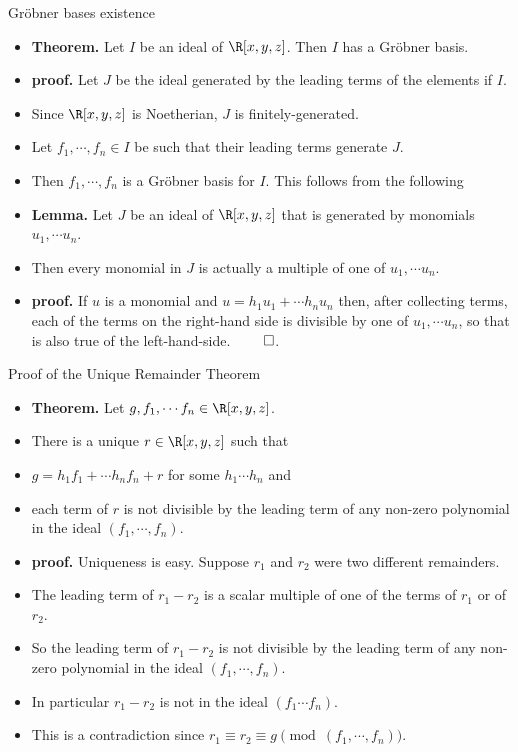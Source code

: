 \documentclass{beamer}
\begin{document}
\begin{frame}{Gr\"{o}bner bases existence}

\begin{itemize}
  \item \textbf{Theorem.} Let $I$ be an ideal of $\R[x,y,z]$. Then $I$ has a Gr\"{o}bner basis.
  \item \textbf{proof.} Let $J$ be the ideal generated by the leading terms of the elements if $I$.
  \item Since $\R[x,y,z]$ is Noetherian, $J$ is finitely-generated.
  \item Let $f_1,\cdots,f_n\in I$ be such that their leading terms generate $J$.
  \item Then $f_1,\cdots, f_n$ is a Gr\"{o}bner basis for $I$. This follows from the following
  \item \textbf{Lemma.} Let $J$ be an ideal of $\R[x,y,z]$ that is generated by monomials $u_1,\cdots u_n$.
  \item Then every monomial in $J$ is actually a multiple of one of $u_1,\cdots u_n$.
  \item\textbf{proof.} If $u$ is a monomial and $u=h_1u_1 + \cdots h_n u_n$ then, after collecting terms, each
  of the terms on the right-hand side is divisible by one of $u_1,\cdots u_n$, so that is also true of the left-hand-side. $\qed$.
\end{itemize}

\end{frame}

\begin{frame}{Proof of the Unique Remainder Theorem}

\begin{itemize}
  \item \textbf{Theorem.} Let $g, f_1,\cdots f_n \in \R[x,y,z]$.
  \item There is a unique $r\in\R[x,y,z]$ such that
  \item $g = h_1 f_1 + \cdots h_n f_n + r$ for some $h_1\cdots h_n$ and
  \item each term of $r$ is not divisible by the leading term of any non-zero polynomial in the ideal $(f_1,\cdots,f_n)$.
  \item \textbf{proof.} Uniqueness is easy. Suppose $r_1$ and $r_2$ were two different remainders.
  \item The leading term of $r_1 - r_2$ is a scalar multiple of one of the terms of $r_1$ or of $r_2$.
  \item So the leading term of $r_1 - r_2$ is not divisible by the leading term of any non-zero polynomial in the ideal $(f_1,\cdots,f_n)$.
  \item In particular $r_1 - r_2$ is not in the ideal $(f_1\cdots f_n)$.
  \item This is a contradiction since $r_1 \equiv r_2 \equiv g \pmod {(f_1,\cdots,f_n)}$.
\end{itemize}

\end{frame}
\end{document}
